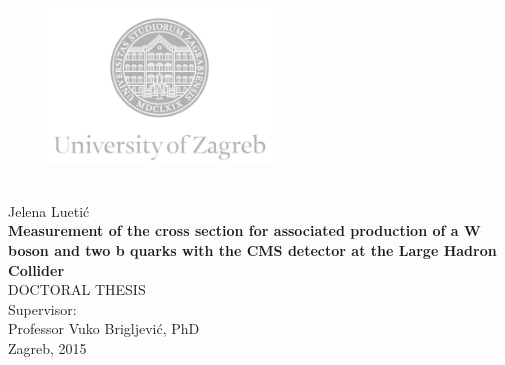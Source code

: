 \documentclass[12pt,oneside, a4paper]{book}
\begin{document}
\begin{titlepage}
  \fontsize{16pt}{20pt}\selectfont
  \selectfont
  \setlength{\intextsep}{0pt plus 0pt minus 0pt}

  \begin{center}
    \begin{figure}[ht!]
      \begin{center}
        \includegraphics[height=4.1184cm, width=5.94cm]{logo_unizg_eng}
      \end{center}
    \end{figure}		
    \vspace{0cm}
    {} \\
    \vspace{1.8cm}
    Jelena Luetić \\
    \vspace{1.8cm}
    {\fontsize{22pt}{22pt}\selectfont\textbf{Measurement of the cross section for associated production of a W boson and two b quarks with the CMS detector at the Large Hadron Collider}} \\
    \vspace{2cm}   
    DOCTORAL THESIS \\  
    \vspace{2cm}   %
    Supervisor:\\Professor Vuko Brigljević, PhD \\
    \vfill{Zagreb, 2015}
  \end{center}
\end{titlepage}
\end{document}
